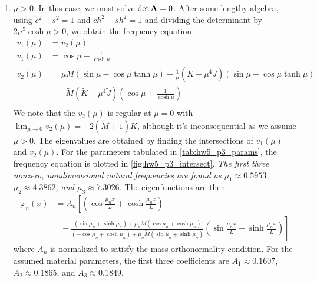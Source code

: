 \begin{enumerate}[(i)]
{\begin{enumerate}[(1)]
{    }
    \item { %
        \emph{$\mu > 0$}. In this case, we must solve $\det \mathbf{A} = 0$. 
        After some lengthy algebra, using $c^2 + s^2 = 1$ and $ch^2 - sh^2 = 1$ and dividing the determinant by $2\mu^5 \cosh\mu > 0$, we obtain the frequency equation 
        \begin{equation}\label{eqn:hw5_p3_freq_eqn}
        \begin{aligned}
            v_1(\mu) &= v_2(\mu)\\
            v_1(\mu) &= \cos\mu - \frac{1}{\cosh\mu} \\
            v_2(\mu) &= \mu \tilde{M}(\sin\mu - \cos\mu \tanh\mu) - \frac{1}{\mu}(\tilde{K}-\mu^4 \tilde{J})(\sin\mu + \cos\mu \tanh\mu) \\
            &~~~- \tilde{M}(\tilde{K}-\mu^4 \tilde{J})(\cos\mu + \frac{1}{\cosh\mu}) \\
        \end{aligned}
        \end{equation}
        We note that the $v_2(\mu)$ is regular at $\mu = 0$ with $\lim_{\mu\rightarrow 0} v_2(\mu) = -2(\tilde{M}+1)\tilde{K}$, although it's inconsequential as we assume $\mu > 0$.
        The eigenvalues are obtained by finding the intersections of $v_1(\mu)$ and $v_2(\mu)$. 
        For the parameters tabulated in \cref{tab:hw5_p3_params}, the frequency equation is plotted in \cref{fig:hw5_p3_intersect}. 
        \emph{The first three nonzero, nondimensional natural frequencies are found as $\mu_1 \approx 0.5953$, $\mu_2 \approx 4.3862$, and $\mu_3 \approx 7.3026$.} 
        The eigenfunctions are then 
        \begin{equation}\label{eqn:hw5_p3_eigenfunction}
        \begin{aligned}
            \varphi_n(x) &= A_n \left[\left(\cos\frac{\mu_n x}{L} + \cosh\frac{\mu_n x}{L}\right) \right. \\
            &~~~ - \left.\frac{(\sin\mu_n+\sinh\mu_n) + \mu_n\tilde{M}(\cos\mu_n + \cosh\mu_n)}{(-\cos\mu_n+\cosh\mu_n) + \mu_n\tilde{M}(\sin\mu_n + \sinh\mu_n)} \left(\sin\frac{\mu_n x}{L} + \sinh\frac{\mu_n x}{L}\right)\right]
        \end{aligned}
        \end{equation}
        where $A_n$ is normalized to satisfy the mass-orthonormality condition. 
        For the assumed material parameters, the first three coefficients are $A_1 \approx 0.1607$, $A_2 \approx 0.1865$, and $A_3 \approx 0.1849$.
        \begin{table}

\end{table}}
\end{enumerate}}
\end{enumerate}

